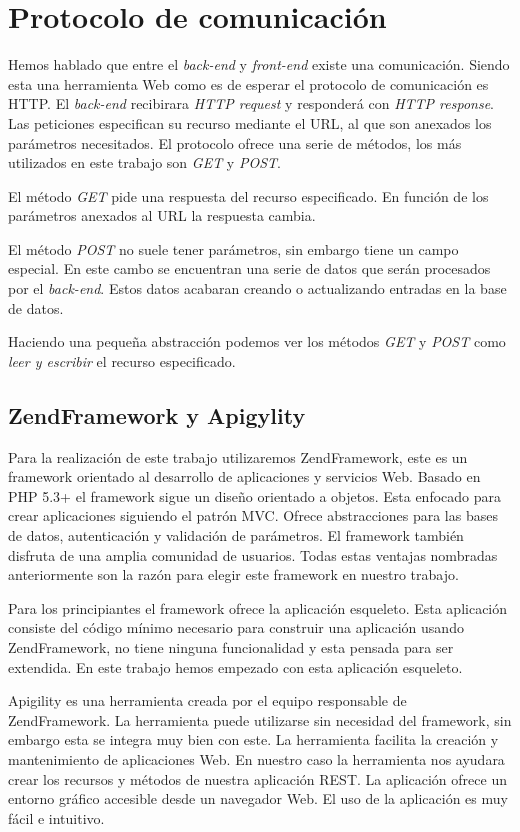 \section{Protocolo de comunicación}
  	Hemos hablado que entre el \emph{back-end} y \emph{front-end} existe una comunicación. Siendo esta una herramienta Web como es de esperar el
	protocolo de comunicación es HTTP\cite{HTTP}. El \emph{back-end} recibirara \emph{HTTP request} y responderá con \emph{HTTP response}. Las
	peticiones especifican su recurso mediante el URL, al que son anexados los parámetros necesitados. El protocolo ofrece una serie de
	métodos, los más utilizados en este trabajo son \emph{GET} y \emph{POST}. 
	\par
	El método \emph{GET} pide una respuesta del recurso especificado. En función de los parámetros anexados al URL la respuesta cambia.
	\par
	El método \emph{POST} no suele tener parámetros, sin embargo tiene un campo especial. En este cambo se encuentran una serie de datos que serán
	procesados por el \emph{back-end}. Estos datos acabaran creando o actualizando entradas en la base de datos. 
	\par
	Haciendo una pequeña abstracción podemos ver los métodos \emph{GET} y \emph{POST} como \emph{leer y escribir} el recurso especificado.
\subsection{ZendFramework y Apigylity}
	Para la realización de este trabajo utilizaremos ZendFramework, este es un framework orientado al desarrollo de aplicaciones y servicios Web.
	Basado en PHP 5.3+ el framework sigue un diseño orientado a objetos. Esta enfocado para crear aplicaciones siguiendo el patrón MVC. Ofrece
	abstracciones para las bases de datos, autenticación y validación de parámetros. El framework también disfruta de una amplia comunidad de 
	usuarios. Todas estas ventajas nombradas anteriormente son la razón para elegir este framework en nuestro trabajo.
	\par
 	Para  los principiantes el framework ofrece la aplicación esqueleto. Esta aplicación consiste del código mínimo necesario para construir una
	aplicación usando ZendFramework, no tiene ninguna funcionalidad y esta pensada para ser extendida. En este trabajo hemos empezado con esta
	aplicación esqueleto.
  	\par 
  	Apigility es una herramienta creada por el equipo responsable de ZendFramework. La herramienta puede utilizarse sin necesidad del framework,
	sin embargo esta se integra muy bien con este. La herramienta facilita la creación y mantenimiento de aplicaciones Web. En nuestro caso la
	herramienta nos ayudara crear los recursos y métodos de nuestra aplicación REST. La aplicación ofrece un entorno gráfico accesible desde un
	navegador Web. El uso de la aplicación es muy fácil e intuitivo.
